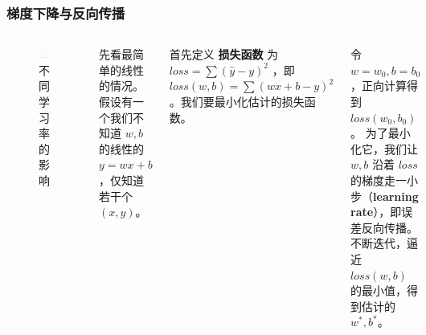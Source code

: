 \documentclass{ctexbeamer}
\begin{document}
\begin{frame}
    \frametitle{梯度下降与反向传播}
    \begin{columns}
        \begin{figure}
            \centering
            \includegraphics[width=\linewidth]{../lib/lr.png}
            \caption{不同学习率的影响}
        \end{figure}
        先看最简单的线性的情况。假设有一个我们不知道 $w,b$ 的线性的 $y=wx+b$ ，仅知道若干个 $(x,y)$。

        首先定义 \textbf{损失函数} 为 $loss = \sum{(\hat{y}-y)^2}$ ，即 $loss(w, b)=\sum(wx+b-y)^2$ 。我们要最小化估计的损失函数。

        令 $w=w_0,b=b_0$ ，正向计算得到 $loss(w_0,b_0)$。
        为了最小化它，我们让 $w,b$ 沿着 $loss$ 的梯度走一小步（\textbf{learning rate}），即误差反向传播。
        不断迭代，逼近 $loss(w,b)$ 的最小值，得到估计的 $w^*,b^*$。
    \end{columns}
\end{frame}
\end{document}

